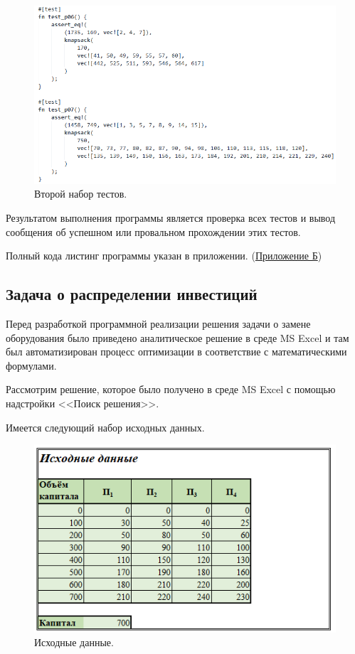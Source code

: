 \begin{figure}[h]
  \centering \includegraphics[scale=0.6]{content/images/impl_knapsack9.png}
  \caption{Второй набор тестов.}
  \label{fig:impl_knapsack9}
\end{figure}

Результатом выполнения программы является проверка всех тестов и вывод сообщения об успешном или провальном прохождении этих тестов. 

Полный кода листинг программы указан в приложении. (\hyperref[sec:appendix2]{Приложение Б})


\subsection{Задача о распределении инвестиций}

\indent Перед разработкой программной реализации решения задачи о замене оборудования было приведено аналитическое решение в среде MS Excel и там был автоматизирован процесс оптимизации в соответствие с математическими формулами.

Рассмотрим решение, которое было получено в среде MS Excel с помощью надстройки <<Поиск решения>>.

Имеется следующий набор исходных данных.
\begin{figure}[h]
  \centering \includegraphics[scale=0.8]{content/images/impl_investing1.png}
  \caption{Исходные данные.}
  \label{fig:impl_investing1}
\end{figure}

